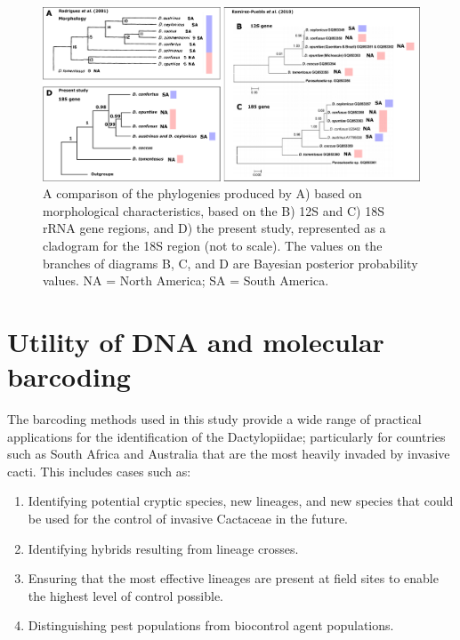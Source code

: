 \begin{landscape}

\begin{figure}[]
	\centering
	\includegraphics[scale =0.38]{Images/phylogeny_comparison.pdf}
	\caption{A comparison of the phylogenies produced by A) \citet{Rodriguez2001} based on morphological characteristics, \citet{Ramirez-Puebla2010MolecularBacteria} based on the B) 12S and C) 18S rRNA gene regions, and D) the present study, represented as a cladogram for the 18S region (not to scale). The values on the branches of diagrams B, C, and D are Bayesian posterior probability values. NA = North America; SA = South America.} 
	\label{fig:phylogeny_comparison}
\end{figure}

\end{landscape}

\section{Utility of DNA and molecular barcoding}
The barcoding methods used in this study provide a wide range of practical applications for the identification of the Dactylopiidae; particularly for countries such as South Africa and Australia that are the most heavily invaded by invasive cacti. This includes cases such as: 
\vspace{.4cm}

\begin{enumerate}
    \item Identifying potential cryptic species, new lineages, and new species that could be used for the control of invasive Cactaceae in the future.
    \item Identifying hybrids resulting from lineage crosses.
    \item Ensuring that the most effective lineages are present at field sites to enable the highest level of control possible.
    \item Distinguishing pest populations from biocontrol agent populations.
\end{enumerate}

